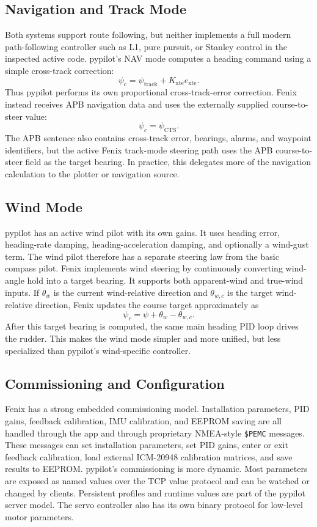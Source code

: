 \documentclass[10pt,twocolumn]{article}
\begin{document}
\subsection{Navigation and Track Mode}
Both systems support route following, but neither implements a full modern
path-following controller such as L1, pure pursuit, or Stanley control in
the inspected active code.
pypilot's NAV mode computes a heading command using a simple cross-track
correction:
\[
\psi_c
=
\psi_{\mathrm{track}}
+
K_{\mathrm{xte}} e_{\mathrm{xte}} .
\]
Thus pypilot performs its own proportional cross-track-error correction.
Fenix instead receives APB navigation data and uses the externally
supplied course-to-steer value:
\[
\psi_c = \psi_{\mathrm{CTS}} .
\]
The APB sentence also contains cross-track error, bearings, alarms, and
waypoint identifiers, but the active Fenix track-mode steering path uses
the APB course-to-steer field as the target bearing.  In practice, this
delegates more of the navigation calculation to the plotter or navigation
source.
\subsection{Wind Mode}
pypilot has an active wind pilot with its own gains.  It uses heading
error, heading-rate damping, heading-acceleration damping, and optionally
a wind-gust term.  The wind pilot therefore has a separate steering law
from the basic compass pilot.
Fenix implements wind steering by continuously converting wind-angle hold
into a target bearing.  It supports both apparent-wind and true-wind
inputs.  If \(\theta_w\) is the current wind-relative direction and
\(\theta_{w,c}\) is the target wind-relative direction, Fenix updates the
course target approximately as
\[
\psi_c
=
\psi
+
\theta_w
-
\theta_{w,c}.
\]
After this target bearing is computed, the same main heading PID loop
drives the rudder.  This makes the wind mode simpler and more unified, but
less specialized than pypilot's wind-specific controller.
\subsection{Commissioning and Configuration}
Fenix has a strong embedded commissioning model.  Installation parameters,
PID gains, feedback calibration, IMU calibration, and EEPROM saving are
all handled through the app and through proprietary NMEA-style
\texttt{\$PEMC} messages.  These messages can set installation parameters,
set PID gains, enter or exit feedback calibration, load external
ICM-20948 calibration matrices, and save results to EEPROM.
pypilot's commissioning is more dynamic.  Most parameters are exposed as
named values over the TCP value protocol and can be watched or changed by
clients.  Persistent profiles and runtime values are part of the pypilot
server model.  The servo controller also has its own binary protocol for
low-level motor parameters.
\end{document}
